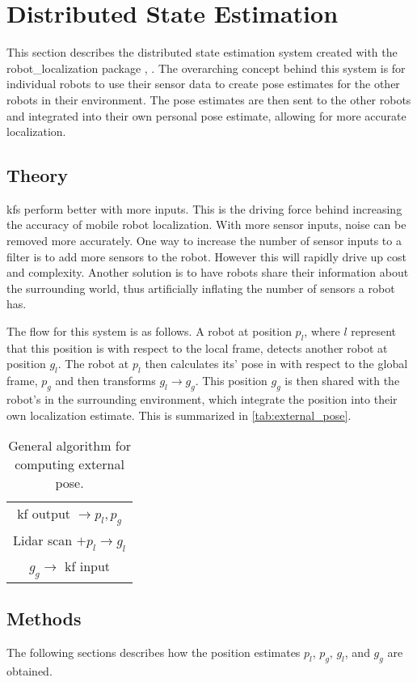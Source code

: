 \documentclass[thesis.tex]{subfile}
\begin{document}
\chapter{Distributed State Estimation} \label{Distributed State Estimation}
This section describes the distributed state estimation system created with the robot\_localization package \cite{MooreStouch2014}, \cite{Moore}. The overarching concept behind this system is for individual robots to use their sensor data to create pose estimates for the other robots in their environment. The pose estimates are then sent to the other robots and integrated into their own personal pose estimate, allowing for more accurate localization.
  
\section{Theory} \label{Theory}
\glspl{kf} perform better with more inputs. This is the driving force behind increasing the accuracy of mobile robot localization. With more sensor inputs, noise can be removed more accurately. One way to increase the number of sensor inputs to a filter is to add more sensors to the robot. However this will rapidly drive up cost and complexity. Another solution is to have robots share their information about the surrounding world, thus artificially inflating the number of sensors a robot has.

The flow for this system is as follows. A robot at position $p_l$, where $l$ represent that this position is with respect to the local frame, detects another robot at position $g_l$. The robot at $p_l$ then calculates its' pose in with respect to the global frame, $p_g$ and then transforms $g_l \rightarrow g_g$. This position $g_g$ is then shared with the robot's in the surrounding environment, which integrate the position into their own localization estimate. This is summarized in \autoref{tab:external_pose}.

\begin{table}
\centering
\begin{tabular}{c}
 \gls{kf} output $\rightarrow p_l, p_g$ \\
Lidar scan $+ p_l \rightarrow g_l$ \\
$g_g \rightarrow$ \gls{kf} input
\end{tabular}
\caption{General algorithm for computing external pose.}
\label{tab:external_pose}
\end{table}

\section{Methods}
The following sections describes how the position estimates $p_l$, $p_g$, $g_l$, and $g_g$ are obtained.
\end{document}
